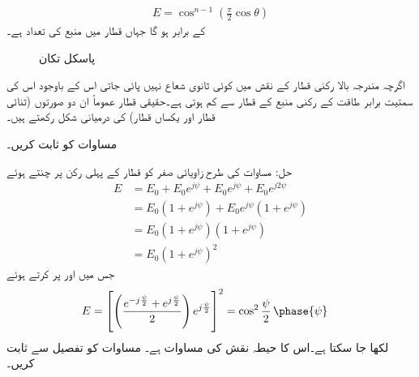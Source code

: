 \begin{align}\label{مساوات_اینٹینا_ثنائی_قطار_نقش}
E=\cos^{n-1} \left(\frac{\pi}{2}\cos \theta\right)
\end{align}
کے برابر ہو گا جہاں قطار میں منبع کی تعداد  ہے۔
\begin{figure}
\centering
{}
\caption{پاسکل تکان}
\label{شکل_اینٹینا_پاسکل_تکون}
\end{figure}

اگرچہ مندرجہ بالا  رکنی  قطار کے نقش میں کوئی ثانوی شعاع نہیں پائی جاتی اس کے باوجود اس کی سمتیت برابر طاقت کے  رکنی منبع کے قطار سے کم ہوتی ہے۔حقیقی قطار عموماً ان دو صورتوں (ثنائی قطار اور یکساں قطار) کی درمیانی شکل رکھتے ہیں۔  

مساوات  کو ثابت کریں۔

حل: مساوات  کی طرح زاویائی صفر کو قطار کے پہلی رکن پر چنتے ہوئے
\begin{align*}
E&=E_0+E_0 e^{j\psi}+ E_0 e^{j\psi}+ E_0 e^{j 2\psi}\\
&=E_0 \left(1+e^{j\psi} \right)+E_0 e^{j\psi}\left(1+e^{j\psi} \right)\\
&=E_0 \left(1+e^{j\psi} \right)\left(1+e^{j\psi} \right)\\
&=E_0 \left(1+e^{j\psi} \right)^2
\end{align*}
جس میں  اور  پر کرتے ہوئے
\begin{align*}
E&=\left[\left(\frac{e^{-j\frac{\psi}{2}}+e^{j \frac{\psi}{2}}}{2}\right)  e^{j\frac{\psi}{2}} \right]^2=\cos^2 \frac{\psi}{2} \, \phase{\psi}
\end{align*}
لکھا جا سکتا ہے۔اس کا حیطہ  نقش کی مساوات ہے۔
مساوات  کو تفصیل سے ثابت کریں۔

